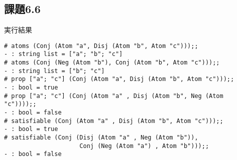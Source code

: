 \documentclass[11pt,a4j]{jarticle}
\begin{document}
\subsection*{課題6.6}

実行結果
\begin{lstlisting}
# atoms (Conj (Atom "a", Disj (Atom "b", Atom "c")));;
- : string list = ["a"; "b"; "c"]
# atoms (Conj (Neg (Atom "b"), Conj (Atom "b", Atom "c")));;
- : string list = ["b"; "c"]
# prop ["a"; "c"] (Conj (Atom "a", Disj (Atom "b", Atom "c")));;
- : bool = true
# prop ["a"; "c"] (Conj (Atom "a" , Disj (Atom "b", Neg (Atom "c"))));;
- : bool = false
# satisfiable (Conj (Atom "a" , Disj (Atom "b", Atom "c")));;
- : bool = true
# satisfiable (Conj (Disj (Atom "a" , Neg (Atom "b")), 
                     Conj (Neg (Atom "a") , Atom "b")));;
- : bool = false
\end{lstlisting}
\end{document}
